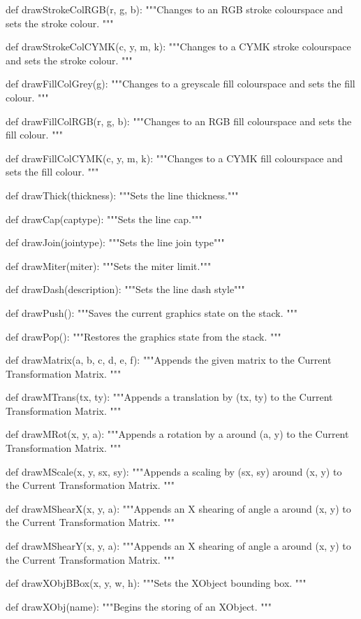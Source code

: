 def drawStrokeColRGB(r, g, b):
    """Changes to an RGB stroke colourspace and sets the stroke colour. """

def drawStrokeColCYMK(c, y, m, k):
    """Changes to a CYMK stroke colourspace and sets the stroke colour. """

def drawFillColGrey(g):
    """Changes to a greyscale fill colourspace and sets the fill colour. """

def drawFillColRGB(r, g, b):
    """Changes to an RGB fill colourspace and sets the fill colour. """

def drawFillColCYMK(c, y, m, k):
    """Changes to a CYMK fill colourspace and sets the fill colour. """

def drawThick(thickness):
    """Sets the line thickness."""

def drawCap(captype):
    """Sets the line cap."""

def drawJoin(jointype):
    """Sets the line join type"""

def drawMiter(miter):
    """Sets the miter limit."""

def drawDash(description):
    """Sets the line dash style"""

def drawPush():
    """Saves the current graphics state on the stack. """

def drawPop():
    """Restores the graphics state from the stack. """

def drawMatrix(a, b, c, d, e, f):
    """Appends the given matrix to the Current Transformation Matrix. """

def drawMTrans(tx, ty):
    """Appends a translation by (tx, ty) to the Current Transformation Matrix.
    """

def drawMRot(x, y, a):
    """Appends a rotation by a around (a, y) to the Current Transformation
    Matrix. """

def drawMScale(x, y, sx, sy):
    """Appends a scaling by (sx, sy) around (x, y) to the Current
    Transformation Matrix. """

def drawMShearX(x, y, a):
    """Appends an X shearing of angle a around (x, y) to the Current
    Transformation Matrix. """

def drawMShearY(x, y, a):
    """Appends an X shearing of angle a around (x, y) to the Current
    Transformation Matrix. """

def drawXObjBBox(x, y, w, h):
    """Sets the XObject bounding box. """

def drawXObj(name):
    """Begins the storing of an XObject. """

